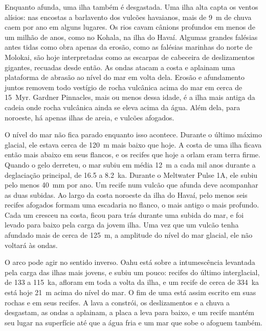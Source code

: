 Enquanto afunda, uma ilha também é desgastada. Uma ilha alta capta os ventos alísios: nas
encostas a barlavento dos vulcões havaianos, mais de \qty{9}{m} de chuva caem por ano em alguns lugares.
Os rios cavam cânions profundos em menos de um milhão de anos, como no Kohala, na ilha do Havaí.
Algumas grandes falésias antes tidas como obra apenas da erosão, como as falésias marinhas do norte de
Molokai, são hoje interpretadas como as escarpas de cabeceira de deslizamentos gigantes, recuadas desde então. As ondas atacam a costa e
aplainam uma plataforma de abrasão ao nível do mar em volta dela. Erosão e afundamento juntos removem todo vestígio
de rocha vulcânica acima do mar em cerca de \qty{15}{Myr}. Gardner Pinnacles, mais ou menos dessa idade, é
a ilha mais antiga da cadeia onde rocha vulcânica ainda se eleva acima da água. Além dela, para
noroeste, há apenas ilhas de areia,  e vulcões afogados.

O nível do mar não fica parado enquanto isso acontece. Durante o último máximo glacial, ele estava cerca de
\qty{120}{m} mais baixo que hoje. A costa de uma ilha ficava então mais abaixo em seus flancos, e os recifes
que hoje a orlam eram terra firme. Quando o gelo derreteu, o mar subiu em média \qty{12}{m}
a cada mil anos durante a deglaciação principal, de 16.5 a \qty{8.2}{ka}. Durante o Meltwater
Pulse 1A, ele subiu pelo menos \qty{40}{mm} por ano. Um recife num vulcão que afunda deve acompanhar as duas
subidas. Ao largo da costa noroeste da ilha do Havaí, pelo menos seis recifes afogados formam uma
escadaria no flanco, o mais antigo o mais profundo. Cada um cresceu na costa, ficou para trás durante uma subida
do mar, e foi levado para baixo pela carga da jovem ilha. Uma vez que um vulcão tenha afundado mais
de cerca de \qty{125}{m}, a amplitude do nível do mar glacial, ele não voltará às ondas.

O arco pode agir no sentido inverso. Oahu está sobre a intumescência levantada pela carga das ilhas mais jovens,
e subiu um pouco: recifes do último interglacial, de 133 a \qty{115}{ka}, afloram em toda a
volta da ilha, e um recife de cerca de \qty{334}{ka} está hoje \qty{21}{m} acima do nível do mar. O
fim de uma  está assim escrito em suas rochas e em seus recifes. A lava a constrói, os deslizamentos e
a chuva a desgastam, as ondas a aplainam, a placa a leva para baixo, e um recife mantém seu lugar na
superfície até que a água fria e um mar que sobe o afoguem também.

